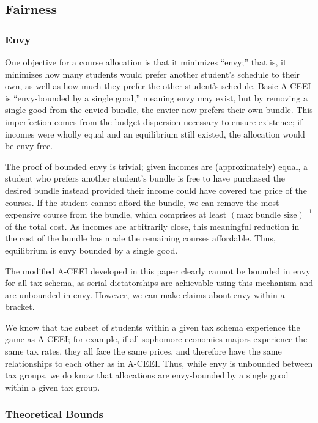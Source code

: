 \documentclass{article}
\begin{document}
\subsection{Fairness}

\subsubsection{Envy}

One objective for a course allocation is that it minimizes ``envy;'' that is, it minimizes how many students would prefer another student's schedule to their own, as well as how much they prefer the other student's schedule. Basic A-CEEI is ``envy-bounded by a single good,'' meaning envy may exist, but by removing a single good from the envied bundle, the envier now prefers their own bundle. This imperfection comes from the budget dispersion necessary to ensure existence; if incomes were wholly equal and an equilibrium still existed, the allocation would be envy-free. 

The proof of bounded envy is trivial; given incomes are (approximately) equal, a student who prefers another student's bundle is free to have purchased the desired bundle instead provided their income could have covered the price of the courses. If the student cannot afford the bundle, we can remove the most expensive course from the bundle, which comprises at least $(\mbox{max bundle size})^{-1}$ of the total cost. As incomes are arbitrarily close, this meaningful reduction in the cost of the bundle has made the remaining courses affordable. Thus, equilibrium is envy bounded by a single good.

The modified A-CEEI developed in this paper clearly cannot be bounded in envy for all tax schema, as serial dictatorships are achievable using this mechanism and are unbounded in envy. However, we can make claims about envy within a bracket.

We know that the subset of students within a given tax schema experience the game as A-CEEI; for example, if all sophomore economics majors experience the same tax rates, they all face the same prices, and therefore have the same relationships to each other as in A-CEEI. Thus, while envy is unbounded between tax groups, we do know that allocations are envy-bounded by a single good within a given tax group.



\subsubsection{Theoretical Bounds}
\end{document}
